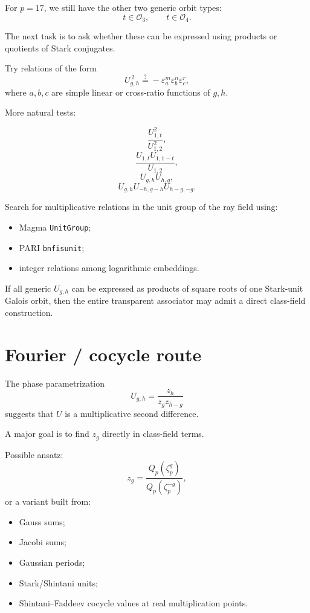\documentclass[11pt,reqno]{amsart}
\theoremstyle{plain}
\begin{document}
For \(p=17\), we still have the other two generic orbit types:
\[
t\in\mathcal O_3,
\qquad
t\in\mathcal O_4.
\]

The next task is to ask whether these can be expressed using products or quotients of Stark conjugates.

Try relations of the form
\[
U_{g,h}^{\,2}
\stackrel{?}{=}
-\varepsilon_{a}^{m}
\varepsilon_{b}^{n}
\varepsilon_{c}^{r},
\]
where \(a,b,c\) are simple linear or cross-ratio functions of \(g,h\).

More natural tests:

\[
\frac{U_{1,t}^2}{U_{1,2}^2},
\]
\[
\frac{U_{1,t}U_{1,1-t}}{U_{1,2}},
\]
\[
U_{g,h}U_{h,g},
\]
\[
U_{g,h}U_{-h,g-h}U_{h-g,-g}.
\]

Search for multiplicative relations in the unit group of the ray field using:

\begin{itemize}
\item Magma \texttt{UnitGroup};
\item PARI \texttt{bnfisunit};
\item integer relations among logarithmic embeddings.
\end{itemize}

If all generic \(U_{g,h}\) can be expressed as products of square roots of one Stark-unit Galois orbit, then the entire transparent associator may admit a direct class-field construction.

\section{Fourier / cocycle route}\label{sec:15}

The phase parametrization
\[
U_{g,h}
=
\frac{z_h}{z_gz_{h-g}}
\]
suggests that \(U\) is a multiplicative second difference.

A major goal is to find \(z_g\) directly in class-field terms.

Possible ansatz:
\[
z_g
=
\frac{Q_p(\zeta_p^g)}
     {Q_p(\zeta_p^{-g})},
\]
or a variant built from:

\begin{itemize}
\item Gauss sums;
\item Jacobi sums;
\item Gaussian periods;
\item Stark/Shintani units;
\item Shintani--Faddeev cocycle values at real multiplication points.
\end{itemize}
\end{document}

